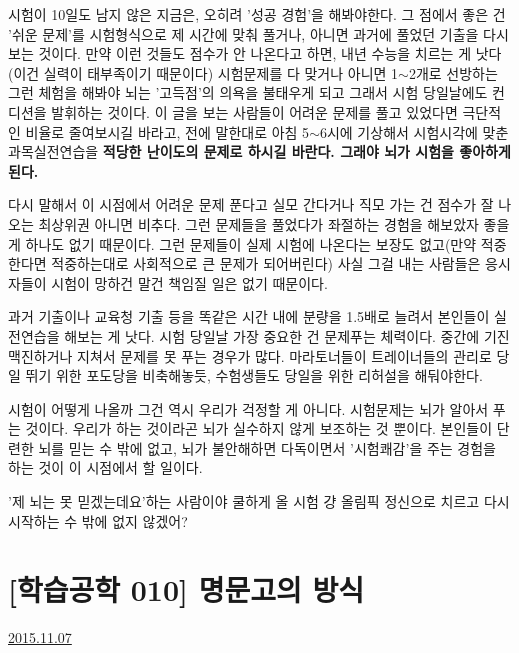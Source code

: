 시험이 10일도 남지 않은 지금은, 오히려 '성공 경험'을 해봐야한다.
그 점에서 좋은 건 '쉬운 문제'를 시험형식으로 제 시간에 맞춰 풀거나, 아니면 과거에 풀었던 기출을 다시 보는 것이다.
만약 이런 것들도 점수가 안 나온다고 하면, 내년 수능을 치르는 게 낫다(이건 실력이 태부족이기 때문이다)
시험문제를 다 맞거나 아니면 1$\sim$2개로 선방하는 그런 체험을 해봐야 뇌는 '고득점'의 의욕을 불태우게 되고
그래서 시험 당일날에도 컨디션을 발휘하는 것이다.
이 글을 보는 사람들이 어려운 문제를 풀고 있었다면
극단적인 비율로 줄여보시길 바라고, 전에 말한대로 아침 5$\sim$6시에 기상해서 시험시각에 맞춘 과목실전연습을
\textbf{적당한 난이도의 문제로 하시길 바란다. 그래야 뇌가 시험을 좋아하게 된다.}
\vspace{5mm}

다시 말해서 이 시점에서 어려운 문제 푼다고 실모 간다거나 직모 가는 건 점수가 잘 나오는 최상위권 아니면 비추다.
그런 문제들을 풀었다가 좌절하는 경험을 해보았자 좋을 게 하나도 없기 때문이다.
그런 문제들이 실제 시험에 나온다는 보장도 없고(만약 적중한다면 적중하는대로 사회적으로 큰 문제가 되어버린다)
사실 그걸 내는 사람들은 응시자들이 시험이 망하건 말건 책임질 일은 없기 때문이다.
\vspace{5mm}

과거 기출이나 교육청 기출 등을 똑같은 시간 내에 분량을 1.5배로 늘려서 본인들이 실전연습을 해보는 게 낫다.
시험 당일날 가장 중요한 건 문제푸는 체력이다. 중간에 기진맥진하거나 지쳐서 문제를 못 푸는 경우가 많다.
마라토너들이 트레이너들의 관리로 당일 뛰기 위한 포도당을 비축해놓듯, 수험생들도 당일을 위한 리허설을 해둬야한다.
\vspace{5mm}

시험이 어떻게 나올까 그건 역시 우리가 걱정할 게 아니다.
시험문제는 뇌가 알아서 푸는 것이다. 우리가 하는 것이라곤 뇌가 실수하지 않게 보조하는 것 뿐이다.
본인들이 단련한 뇌를 믿는 수 밖에 없고, 뇌가 불안해하면 다독이면서 '시험쾌감'을 주는 경험을 하는 것이 이 시점에서 할 일이다.
\vspace{5mm}

'제 뇌는 못 믿겠는데요'하는 사람이야 쿨하게 올 시험 걍 올림픽 정신으로 치르고 다시 시작하는 수 밖에 없지 않겠어?
\vspace{5mm}




\section{[학습공학 010] 명문고의 방식}
\href{https://www.kockoc.com/Apoc/466731}{2015.11.07}

\vspace{5mm}


